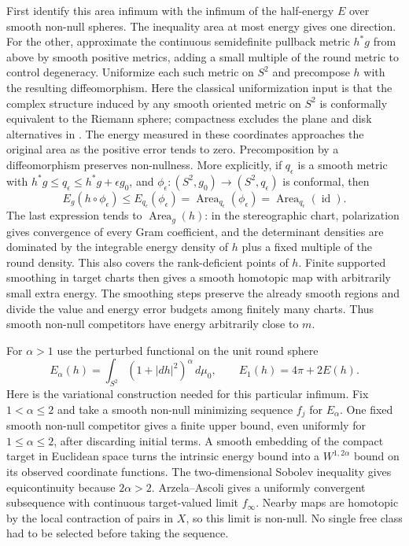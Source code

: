 First identify this area infimum with the infimum of the half-energy
$E$ over smooth non-null spheres. The inequality area at most energy
gives one direction. For the other, approximate the continuous
semidefinite pullback metric $h^*g$ from above by smooth positive
metrics, adding a small multiple of the round metric to control
degeneracy. Uniformize each such metric on $S^2$ and precompose $h$
with the resulting diffeomorphism. Here the classical uniformization
input is that the complex structure induced by any smooth oriented
metric on $S^2$ is conformally equivalent to the Riemann sphere;
compactness excludes the plane and disk alternatives in
\cite[Theorem 1.11.1, p.~14]{MilicicRiemannSurfaces}.
The energy measured in these
coordinates approaches the original area as the positive error tends
to zero. Precomposition by a diffeomorphism preserves non-nullness.
More explicitly, if $q_\epsilon$ is a smooth metric with
$h^*g\leq q_\epsilon\leq h^*g+\epsilon g_0$, and
$\phi_\epsilon:(S^2,g_0)\to(S^2,q_\epsilon)$ is conformal, then
\[
 E_g(h\circ\phi_\epsilon)
 \leq E_{q_\epsilon}(\phi_\epsilon)
 =\operatorname{Area}_{q_\epsilon}(\phi_\epsilon)
 =\operatorname{Area}_{q_\epsilon}(\operatorname{id}).
\]
The last expression tends to $\operatorname{Area}_g(h)$: in the
stereographic chart, polarization gives convergence of every Gram
coefficient, and the determinant densities are dominated by the
integrable energy density of $h$ plus a fixed multiple of the round
density. This also covers the rank-deficient points of $h$.
Finite supported smoothing in target charts then gives a smooth
homotopic map with arbitrarily small extra energy. The smoothing steps
preserve the already smooth regions and divide the value and energy
error budgets among finitely many charts. Thus smooth non-null
competitors have energy arbitrarily close to $m$.

For $\alpha>1$ use the perturbed functional on the unit round sphere
\[
 E_\alpha(h)=\int_{S^2}(1+|dh|^2)^\alpha\,d\mu_0,
 \qquad E_1(h)=4\pi+2E(h).
\]
Here is the variational construction needed for this particular
infimum. Fix $1<\alpha\leq2$ and take a smooth non-null minimizing
sequence $f_j$ for $E_\alpha$. One fixed smooth non-null competitor
gives a finite upper bound, even uniformly for $1\leq\alpha\leq2$,
after discarding initial terms. A smooth embedding of the compact
target in Euclidean space turns the intrinsic energy bound into a
$W^{1,2\alpha}$ bound on its observed coordinate functions. The
two-dimensional Sobolev inequality gives equicontinuity because
$2\alpha>2$. Arzela--Ascoli gives a uniformly convergent subsequence
with continuous target-valued limit $f_\infty$. Nearby maps are
homotopic by the local contraction of pairs in $X$, so this limit is
non-null. No single free class had to be selected before taking the
sequence.

